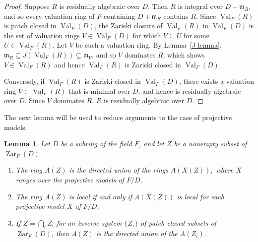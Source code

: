 \documentclass[preprint, 11pt,nonatbib]{elsarticle}
\DeclareMathOperator{\Dom}{Val}
\DeclareMathOperator{\Zar}{Zar}
\newtheorem{lemma}[theorem]{Lemma}
\theoremstyle{definition}
\numberwithin{theorem}{section}
\begin{document}
\begin{proof} 
 Suppose $R$ is residually algebraic over $D$. Then $R$ is integral over $D+{\mathfrak{m}}_R$, and so every valuation ring of $F$ containing $D+{\mathfrak{m}}_R$ contains $R$. Since $\Dom_F(R)$ is patch closed in $\Dom_F(D)$, the Zariski closure of $\Dom_F(R)$ in $\Dom_F(D)$ is the set of valuation rings $V \in \Dom_F(D)$ for which $V \subseteq U$ for some $U \in \Dom_F(R)$. Let $V$ be  such a valuation ring. 
 By Lemma~\ref{J lemma},
 ${\mathfrak{m}}_R \subseteq J(\Dom_F(R)) \subseteq {\mathfrak{m}}_V$, and  so   
$V$ dominates $R$, which shows $V \in \Dom_F(R)$ and hence $\Dom_F(R)$ is Zariski closed in $\Dom_F(D)$.   

Conversely, if $\Dom_F(R)$ is Zariski closed in $\Dom_F(D)$, there exists a valuation ring $V \in \Dom_F(R)$ that is minimal over $D$, and hence is residually algebraic over $D$. Since $V$ dominates $R$, $R$ is residually algebraic over $D$. 
 \end{proof} 
 

The next lemma will be used to reduce arguments to the case of projective models. 

\begin{lemma} \label{directed models} \label{inverse system}
Let $D$ be a subring of the field $F$,  and let $Z$ be a nonempty subset of $\Zar_F(D)$.   
\begin{enumerate}
\item[$(1)$] The ring $A(Z)$ is the directed union of the rings $A(X(Z)),$ where $X$ ranges over the projective models of $F/D$.

 
\item[$(2)$] The  ring $A({Z})$ is local if and only if $A(X({Z}))$ is local for each projective model $X$ of $F/D$.
 

\item[$(3)$] If $Z = \bigcap_{i}Z_i$ for    an inverse system $\{Z_i\}$ of   patch closed subsets of $\Zar_F(D)$, then $\textstyle{A(Z)}$ is the directed union of the $ A(Z_i).$
\end{enumerate}
\end{lemma}
\end{document}
